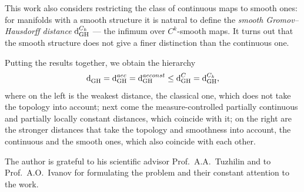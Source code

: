 This work also considers restricting the class of continuous maps to smooth ones: for manifolds with a smooth structure it is natural to define the \emph{smooth Gromov--Hausdorff distance} $\operatorname{d}^{C_k}_{\mathrm{GH}}$ --- the infimum over $C^k$-smooth maps.
It turns out that the smooth structure does not give a finer distinction than the continuous one.

Putting the results together, we obtain the hierarchy
$$
  \operatorname{d}^{}_{\mathrm{GH}} = \operatorname{d}^{aec}_{\mathrm{GH}} = \operatorname{d}^{aeconst}_{\mathrm{GH}} \leq \operatorname{d}^{C}_{\mathrm{GH}} = \operatorname{d}^{C_k}_{\mathrm{GH}},
$$
where on the left is the weakest distance, the classical one, which does not take the topology into account; next come the measure-controlled partially continuous and partially locally constant distances, which coincide with it; on the right are the stronger distances that take the topology and smoothness into account, the continuous and the smooth ones, which also coincide with each other.

The author is grateful to his scientific advisor Prof.~A.A.~Tuzhilin and to Prof.~A.O.~Ivanov for formulating the problem and their constant attention to the work.
